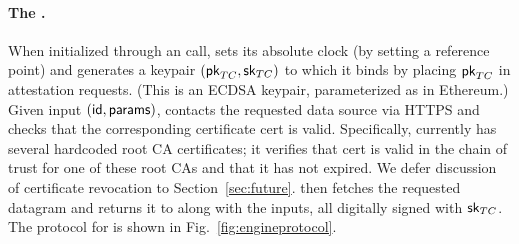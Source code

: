 \paragraph{The \encname \engine.} When initialized through an \initcall call, \engine sets its absolute clock (by setting a reference point) and generates a keypair $({\sf pk}_{TC},{\sf sk}_{TC})$ to which it binds by placing ${\sf pk}_{TC}$ in attestation requests. (This is an ECDSA keypair, parameterized as in Ethereum.) Given input \resumecall $({\sf id}, {\sf params})$, \engine contacts the requested data source via HTTPS and checks that the corresponding certificate {\sf cert} is valid. Specifically, \engine currently has several hardcoded root CA certificates; it verifies that {\sf cert} is valid in the chain of trust for one of these root CAs and that it has not expired. We defer discussion of certificate revocation to Section~\ref{sec:future}. \engine then fetches the requested datagram and returns it to \relay along with the inputs, all digitally signed with ${\sf sk}_{TC}$. The protocol for \engine is shown in Fig.~\ref{fig:engineprotocol}.


